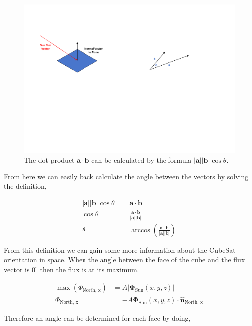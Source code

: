\documentclass[10pt, letterpaper]{article}
\begin{document}
\begin{figure}[H]
	\centering
	\includegraphics[scale=1]{DotProductDiagram.pdf}
    \caption{The dot product $\mathbf{a} \cdot \mathbf{b}$ can be calculated by the formula $|\mathbf{a}||\mathbf{b}| \cos{\theta}$.}
    \label{fig:DotProductDiagram}
\end{figure}

From here we can easily back calculate the angle between the vectors by solving the definition,

\begin{align*}
|\mathbf{a}||\mathbf{b}| \cos{\theta} &= \mathbf{a} \cdot \mathbf{b} \\
\cos{\theta} &= \frac{\mathbf{a} \cdot \mathbf{b}}{|\mathbf{a}||\mathbf{b}|} \\
\theta &= \arccos{\left(\frac{\mathbf{a} \cdot \mathbf{b}}{|\mathbf{a}||\mathbf{b}|}\right)}
\end{align*}

From this definition we can gain some more information about the CubeSat orientation in space. When the angle between the face of the cube and the flux vector is $0^{\circ}$ then the flux is at its maximum.

\begin{align*}
    \max{(\Phi_{\text{North, x}})} &= A |\mathbf{\Phi}_{\text{Sun}}(x, y, z)| \\
    \Phi_{\text{North, x}} &= -A \mathbf{\Phi}_{\text{Sun}}(x, y, z) \cdot \mathbf{\hat{n}}_{\textrm{North, x}}
\end{align*}

Therefore an angle can be determined for each face by doing,
\end{document}

